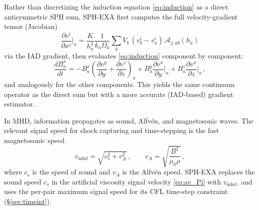 Rather than discretizing the induction equation \eqref{eq:induction} as a direct antisymmetric SPH sum, SPH-EXA first computes the full velocity-gradient tensor (Jacobian) 
\begin{equation}
    \frac{\partial v^i}{\partial x^j}\bigg|_a = \frac{K}{h_a^3}\frac{1}{k_a \Omega_a} \sum_b V_b \,(v^i_b - v^i_a)\, \mathcal{A}_{j,ab}(h_a)
    \label{eq:vel_jacobian} 
\end{equation}
via the IAD gradient, then evaluates \eqref{eq:induction} component by component:
\begin{equation}
    \frac{dB^x_a}{dt} = -B^x_a \left(\frac{\partial v^y}{\partial y} + \frac{\partial v^z}{\partial z}\right)_{\!a} + B^y_a \frac{\partial v^x}{\partial y}\bigg|_a + B^z_a \frac{\partial v^x}{\partial z}\bigg|_a\,,
    \label{eq:induction_code}
\end{equation} 
and analogously for the other components. This yields the same continuum operator as the direct sum but with a more accurate (IAD-based) gradient estimator.


In MHD, information propagates as sound, Alfvén, and magnetosonic waves. The relevant signal speed for shock capturing and time-stepping is the fast magnetosonic speed
\begin{equation}
    v_\mathrm{mhd} = \sqrt{c_s^2 + v_A^2}\,, \qquad v_A = \sqrt{\frac{B^2}{\mu_0 \rho}}\,,
    \label{eq:vmhd}
\end{equation}
where $c_s$ is the speed of sound and $v_A$ is the Alfvén speed. SPH-EXA replaces the sound speed $c_s$ in the artificial viscosity signal velocity \eqref{eq:av_Pi} with $v_\mathrm{mhd}$, and uses the per-pair maximum signal speed for its CFL time-step constraint (§\ref{sec:timeint}).


